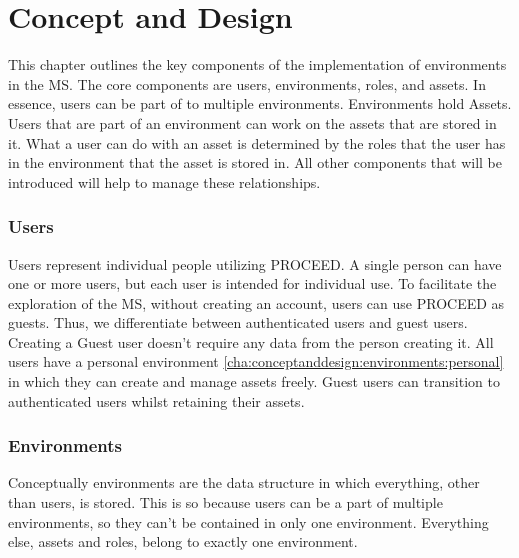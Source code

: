 \chapter{Concept and Design}
\label{cha:conceptanddesign}

This chapter outlines the key components of the implementation of environments in the MS.
The core components are users, environments, roles, and assets.
In essence, users can be part of to multiple environments.
Environments hold Assets.
Users that are part of an environment can work on the assets that are stored in it.
What a user can do with an asset is determined by the roles that the user has in the
environment that the asset is stored in.
All other components that will be introduced will help to manage these relationships.

\subsection{Users}
\label{cha:conceptanddesign:users}

Users represent individual people utilizing PROCEED.
A single person can have one or more users, but each user is intended for individual use.
To facilitate the exploration of the MS, without creating an account, users
can use PROCEED as guests.
Thus, we differentiate between authenticated users and guest users.
Creating a Guest user doesn't require any data from the person creating it.
All users have a personal environment \ref{cha:conceptanddesign:environments:personal} %
in which they can create and manage assets freely.
Guest users can transition to authenticated users whilst retaining their assets.



%

\subsection{Environments}
\label{cha:conceptanddesign:environments}

Conceptually environments are the data structure in which everything, other than users, is
stored.
This is so because users can be a part of multiple environments, so they can't be
contained in only one environment.
Everything else, assets and roles, belong to exactly one environment.


